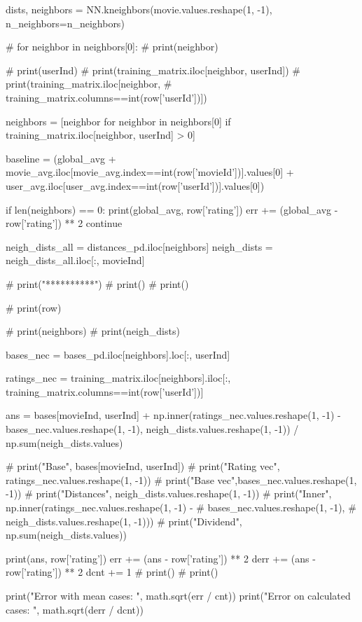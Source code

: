 \begin{latin}
\begin{python}
    dists, neighbors = NN.kneighbors(movie.values.reshape(1, -1), n_neighbors=n_neighbors)


    #  for neighbor in neighbors[0]:
    #      print(neighbor)

    #      print(userInd)
    #      print(training_matrix.iloc[neighbor, userInd])
    #      print(training_matrix.iloc[neighbor,
    #              training_matrix.columns==int(row['userId'])])

    neighbors = [neighbor for neighbor in neighbors[0] if
            training_matrix.iloc[neighbor, userInd] > 0]

    baseline = (global_avg +
            movie_avg.iloc[movie_avg.index==int(row['movieId'])].values[0] +
            user_avg.iloc[user_avg.index==int(row['userId'])].values[0])


    if len(neighbors) == 0:
        print(global_avg, row['rating'])
        err += (global_avg - row['rating']) ** 2
        continue


    neigh_dists_all = distances_pd.iloc[neighbors]
    neigh_dists = neigh_dists_all.iloc[:, movieInd]

    #  print("**********")
    #  print()
    #  print()

    #  print(row)

    #  print(neighbors)
    #  print(neigh_dists)

    bases_nec = bases_pd.iloc[neighbors].loc[:,
            userInd]

    ratings_nec = training_matrix.iloc[neighbors].iloc[:,
            training_matrix.columns==int(row['userId'])]


    ans = bases[movieInd, userInd] + np.inner(ratings_nec.values.reshape(1, -1) -
            bases_nec.values.reshape(1, -1),
            neigh_dists.values.reshape(1, -1)) / np.sum(neigh_dists.values)

    #  print("Base", bases[movieInd, userInd])
    #  print("Rating vec", ratings_nec.values.reshape(1, -1))
    #  print("Base vec",bases_nec.values.reshape(1, -1))
    #  print("Distances", neigh_dists.values.reshape(1, -1))
    #  print("Inner", np.inner(ratings_nec.values.reshape(1, -1) -
    #          bases_nec.values.reshape(1, -1),
    #          neigh_dists.values.reshape(1, -1)))
    #  print("Dividend", np.sum(neigh_dists.values))


    print(ans, row['rating'])
    err += (ans - row['rating']) ** 2
    derr += (ans - row['rating']) ** 2
    dcnt += 1
    #  print()
    #  print()

print("Error with mean cases: ", math.sqrt(err / cnt))
print("Error on calculated cases: ", math.sqrt(derr / dcnt))

  \end{python}
\end{latin}


